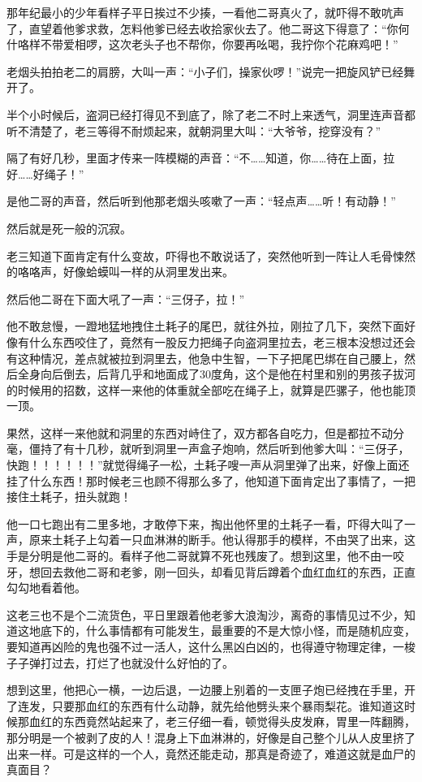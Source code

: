那年纪最小的少年看样子平日挨过不少揍，一看他二哥真火了，就吓得不敢吭声了，直望着他爹求救，怎料他爹已经去收拾家伙去了。他二哥这下得意了：“你何什咯样不带爱相啰，这次老头子也不帮你，你要再吆喝，我拧你个花麻鸡吧！”

老烟头拍拍老二的肩膀，大叫一声：“小子们，操家伙啰！”说完一把旋风铲已经舞开了。

半个小时候后，盗洞已经打得见不到底了，除了老二不时上来透气，洞里连声音都听不清楚了，老三等得不耐烦起来，就朝洞里大叫：“大爷爷，挖穿没有？”

隔了有好几秒，里面才传来一阵模糊的声音：“不……知道，你……待在上面，拉好……好绳子！”

是他二哥的声音，然后听到他那老烟头咳嗽了一声：“轻点声……听！有动静！”

然后就是死一般的沉寂。

老三知道下面肯定有什么变故，吓得也不敢说话了，突然他听到一阵让人毛骨悚然的咯咯声，好像蛤蟆叫一样的从洞里发出来。

然后他二哥在下面大吼了一声：“三伢子，拉！”

他不敢怠慢，一蹬地猛地拽住土耗子的尾巴，就往外拉，刚拉了几下，突然下面好像有什么东西咬住了，竟然有一股反力把绳子向盗洞里拉去，老三根本没想过还会有这种情况，差点就被拉到洞里去，他急中生智，一下子把尾巴绑在自己腰上，然后全身向后倒去，后背几乎和地面成了30度角，这个是他在村里和别的男孩子拔河的时候用的招数，这样一来他的体重就全部吃在绳子上，就算是匹骡子，他也能顶一顶。

果然，这样一来他就和洞里的东西对峙住了，双方都各自吃力，但是都拉不动分毫，僵持了有十几秒，就听到洞里一声盒子炮响，然后听到他爹大叫：“三伢子，快跑！！！！！！”就觉得绳子一松，土耗子嗖一声从洞里弹了出来，好像上面还挂了什么东西！那时候老三也顾不得那么多了，他知道下面肯定出了事情了，一把接住土耗子，扭头就跑！

他一口七跑出有二里多地，才敢停下来，掏出他怀里的土耗子一看，吓得大叫了一声，原来土耗子上勾着一只血淋淋的断手。他认得那手的模样，不由哭了出来，这手是分明是他二哥的。看样子他二哥就算不死也残废了。想到这里，他不由一咬牙，想回去救他二哥和老爹，刚一回头，却看见背后蹲着个血红血红的东西，正直勾勾地看着他。

这老三也不是个二流货色，平日里跟着他老爹大浪淘沙，离奇的事情见过不少，知道这地底下的，什么事情都有可能发生，最重要的不是大惊小怪，而是随机应变，要知道再凶险的鬼也强不过一活人，这什么黑凶白凶的，也得遵守物理定律，一梭子子弹打过去，打烂了也就没什么好怕的了。

想到这里，他把心一横，一边后退，一边腰上别着的一支匣子炮已经拽在手里，开了连发，只要那血红的东西有什么动静，就先给他劈头来个暴雨梨花。谁知道这时候那血红的东西竟然站起来了，老三仔细一看，顿觉得头皮发麻，胃里一阵翻腾，那分明是一个被剥了皮的人！混身上下血淋淋的，好像是自己整个儿从人皮里挤了出来一样。可是这样的一个人，竟然还能走动，那真是奇迹了，难道这就是血尸的真面目？

